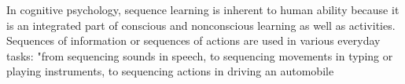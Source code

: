 \documentclass[a4paper]{article}
\title{}
\date{}
\author{Mohammad Rahmani}
\begin{document}
\maketitle
    In cognitive psychology, sequence learning is inherent to human ability because it is an integrated part of conscious and nonconscious learning as well as activities. Sequences of information or sequences of actions are used in various everyday tasks: "from sequencing sounds in speech, to sequencing movements in typing or playing instruments, to sequencing actions in driving an automobile 
    
    
\end{document}

